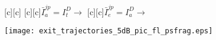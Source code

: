 \documentclass{article}
\begin{document}
\begin{figure}[htb]
  \begin{center}

    	[c]{$$}
        [c][c]{$\bar{I}_a^{jp}=I_t^D\rightarrow$}
        [c][c]{$\bar{I}_e^{jp}=I_a^D\rightarrow$}

    \texttt{[image: exit\_trajectories\_5dB\_pic\_fl\_psfrag.eps]}
    \end{center}
\end{figure}
\end{document}
